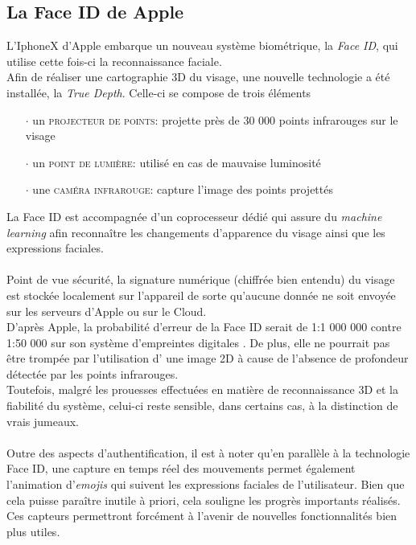 \subsection{La Face ID de Apple}
L'IphoneX d'Apple embarque un nouveau système biométrique, la \textit{Face ID}, qui utilise cette fois-ci la reconnaissance faciale.
\\Afin de réaliser une cartographie 3D du visage, une nouvelle technologie a été installée, la \textit{True Depth}. Celle-ci se compose de trois éléments \cite{Xmisc_4}
\begin{itemize}
\item[$\cdot$]un \textsc{projecteur de points}: projette près de 30 000 points infrarouges sur le visage
\item[$\cdot$]un \textsc{point de lumière}: utilisé en cas de mauvaise luminosité
\item[$\cdot$]une \textsc{caméra infrarouge}: capture l'image des points projettés
\end{itemize}
La Face ID est accompagnée d'un coprocesseur dédié qui assure du \textit{machine learning} afin reconnaître les changements d'apparence du visage ainsi que les expressions faciales.

\paragraph{}Point de vue sécurité, la signature numérique (chiffrée bien entendu) du visage est stockée localement sur l'appareil de sorte qu'aucune donnée ne soit envoyée sur les serveurs d'Apple ou sur le Cloud.
\\D'après Apple, la probabilité d'erreur de la Face ID serait de 1:1 000 000 contre 1:50 000 sur son système d'empreintes digitales \cite{Xmisc_5}. De plus, elle ne pourrait pas être trompée par l'utilisation d' une image 2D à cause de l'absence de profondeur détectée par les points infrarouges. \\Toutefois, malgré les prouesses effectuées en matière de reconnaissance 3D et la fiabilité du système, celui-ci reste sensible, dans certains cas, à la distinction de vrais jumeaux.

\paragraph{}Outre des aspects d'authentification, il est à noter qu'en parallèle à la technologie Face ID, une capture en temps réel des mouvements permet également l'animation d'\textit{emojis} qui suivent les expressions faciales de l'utilisateur. Bien que cela puisse paraître inutile à priori, cela souligne les progrès importants réalisés. Ces capteurs permettront forcément à l'avenir de nouvelles fonctionnalités bien plus utiles.

